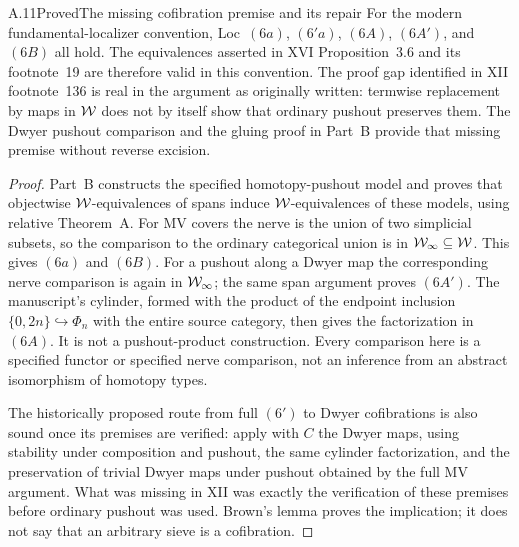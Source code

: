 \begin{claim}{A.11}{Proved}{The missing cofibration premise and its repair}
For the modern fundamental-localizer convention, Loc~$(6a)$, $(6'a)$, $(6A)$, $(6A')$, and $(6B)$ all hold. The equivalences asserted in XVI Proposition~3.6 and its footnote~19 are therefore valid in this convention. The proof gap identified in XII footnote~136 is real in the argument as originally written: termwise replacement by maps in $\mathcal{W}$ does not by itself show that ordinary pushout preserves them. The Dwyer pushout comparison and the gluing proof in Part~B provide that missing premise without reverse excision.
\end{claim}
\begin{proof}
Part~B constructs the specified homotopy-pushout model and proves that objectwise $\mathcal{W}$-equivalences of spans induce $\mathcal{W}$-equivalences of these models, using relative Theorem~A. For MV covers the nerve is the union of two simplicial subsets, so the comparison to the ordinary categorical union is in $\mathcal{W}_{\infty}\subseteq\mathcal{W}$. This gives $(6a)$ and $(6B)$. For a pushout along a Dwyer map the corresponding nerve comparison is again in $\mathcal{W}_{\infty}$; the same span argument proves $(6A')$. The manuscript's cylinder, formed with the product of the endpoint inclusion $\{0,2n\}\hookrightarrow\Phi_n$ with the entire source category, then gives the factorization in $(6A)$. It is not a pushout-product construction. Every comparison here is a specified functor or specified nerve comparison, not an inference from an abstract isomorphism of homotopy types.

The historically proposed route from full $(6')$ to Dwyer cofibrations is also sound once its premises are verified: apply  with $C$ the Dwyer maps, using stability under composition and pushout, the same cylinder factorization, and the preservation of trivial Dwyer maps under pushout obtained by the full MV argument. What was missing in XII was exactly the verification of these premises before ordinary pushout was used. Brown's lemma proves the implication; it does not say that an arbitrary sieve is a cofibration.
\end{proof}

